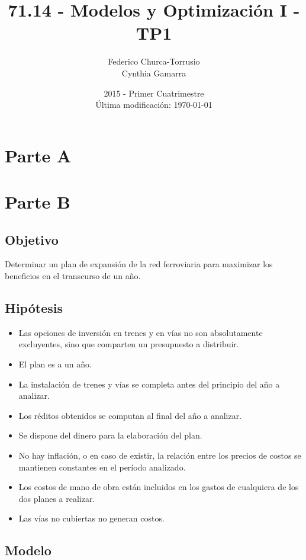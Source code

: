 \documentclass[10pt, a4paper, titlepage,
	oneside,
	fleqn, leqno]{article}
\title{71.14 - Modelos y Optimización I - TP1}
\author{
	Federico Churca-Torrusio\\
	Cynthia Gamarra}
\date{2015 - Primer Cuatrimestre\\
	Última modificación: \today}
\let\oldsection\section
\def\section{\cleardoublepage\oldsection}
\begin{document}
\maketitle
\thispagestyle{empty}
\cleardoublepage

\setcounter{page}{1}

\section{Parte A}
\section{Parte B}
\subsection{Objetivo}
Determinar un plan de expansión de la red ferroviaria para maximizar los beneficios en el transcurso de un año.

\subsection{Hipótesis}
\begin{itemize}
 \item Las opciones de inversión en trenes y en vías no son absolutamente excluyentes, sino que comparten un presupuesto a distribuir.
 \item El plan es a un año.
 \item La instalación de trenes y vías se completa antes del principio del año a analizar.
 \item Los réditos obtenidos se computan al final del año a analizar.
 \item Se dispone del dinero para la elaboración del plan.
 \item No hay inflación, o en caso de existir, la relación entre los precios de costos se mantienen constantes en el período analizado.
 \item Los costos de mano de obra están incluidos en los gastos de cualquiera de los dos planes a realizar.
 \item Las vías no cubiertas no generan costos.
\end{itemize}

\subsection{Modelo}
\end{document}
